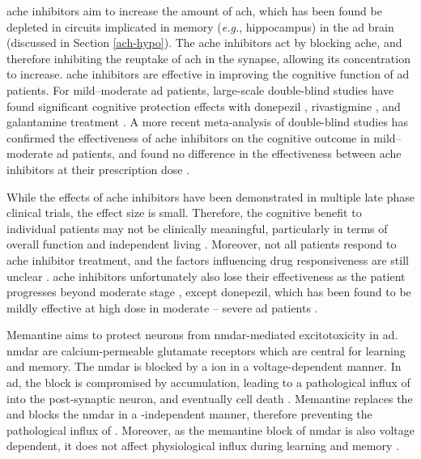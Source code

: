 \Gls{ache} inhibitors aim to increase the amount of \gls{ach}, which has been found be depleted in circuits implicated in memory (\textit{e.g.}, hippocampus) in the \gls{ad} brain (discussed in Section \ref{ach-hypo}). The \gls{ache} inhibitors act by blocking \gls{ache}, and therefore inhibiting the reuptake of \gls{ach} in the synapse, allowing its concentration to increase. \Gls{ache} inhibitors are effective in improving the cognitive function of  \gls{ad} patients. For mild--moderate \gls{ad} patients, large-scale double-blind studies have found significant cognitive protection effects with donepezil \citep{rogers98}, rivastigmine \citep{farlow00}, and galantamine treatment \citep{wilkinson01}. A more recent meta-analysis of double-blind studies has confirmed the effectiveness of \gls{ache} inhibitors on the cognitive outcome in mild--moderate \gls{ad} patients, and found no difference in the effectiveness between \gls{ache} inhibitors at their prescription dose \citep{tan14}.

While the effects of \gls{ache} inhibitors have been demonstrated in multiple late phase clinical trials, the effect size is small. Therefore, the cognitive benefit to individual patients may not be clinically meaningful, particularly in terms of overall function and independent living \citep{lin13}. Moreover, not all patients respond to \gls{ache} inhibitor treatment, and the factors influencing drug responsiveness are still unclear \citep{vanderputt06}. \gls{ache} inhibitors unfortunately also lose their effectiveness as the patient progresses beyond moderate stage \citep{gillette-guyonnet11}, except donepezil, which has been found to be mildly effective at high dose in moderate -- severe \gls{ad} patients \citep{sabbagh13}. 

Memantine aims to protect neurons from \gls{nmdar}-mediated excitotoxicity in \gls{ad}. \Gls{nmdar} are calcium-permeable glutamate receptors which are central for learning and memory. The \Gls{nmdar} is blocked by a  ion in a voltage-dependent manner. In \gls{ad}, the  block is compromised by \abeta{} accumulation, leading to a pathological influx of  into the post-synaptic neuron, and eventually cell death \citep{danysz12}. Memantine replaces the  and blocks the \gls{nmdar} in a \abeta{}-independent manner, therefore preventing the pathological influx of . Moreover, as the memantine block of \gls{nmdar} is also voltage dependent, it does not affect physiological  influx during learning and memory \citep{danysz12}.

